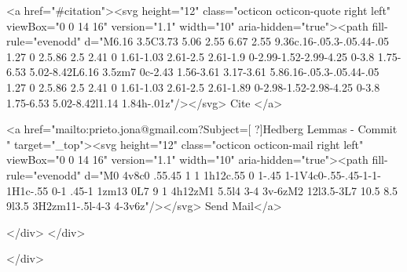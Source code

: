       <a  href="#citation"><svg height="12" class="octicon octicon-quote right left" viewBox="0 0 14 16" version="1.1" width="10" aria-hidden="true"><path fill-rule="evenodd" d="M6.16 3.5C3.73 5.06 2.55 6.67 2.55 9.36c.16-.05.3-.05.44-.05 1.27 0 2.5.86 2.5 2.41 0 1.61-1.03 2.61-2.5 2.61-1.9 0-2.99-1.52-2.99-4.25 0-3.8 1.75-6.53 5.02-8.42L6.16 3.5zm7 0c-2.43 1.56-3.61 3.17-3.61 5.86.16-.05.3-.05.44-.05 1.27 0 2.5.86 2.5 2.41 0 1.61-1.03 2.61-2.5 2.61-1.89 0-2.98-1.52-2.98-4.25 0-3.8 1.75-6.53 5.02-8.42l1.14 1.84h-.01z"/></svg> Cite
      </a>

      <a href="mailto:prieto.jona@gmail.com?Subject=[ ?]Hedberg Lemmas - Commit " target="_top"><svg height="12" class="octicon octicon-mail right left" viewBox="0 0 14 16" version="1.1" width="10" aria-hidden="true"><path fill-rule="evenodd" d="M0 4v8c0 .55.45 1 1 1h12c.55 0 1-.45 1-1V4c0-.55-.45-1-1-1H1c-.55 0-1 .45-1 1zm13 0L7 9 1 4h12zM1 5.5l4 3-4 3v-6zM2 12l3.5-3L7 10.5 8.5 9l3.5 3H2zm11-.5l-4-3 4-3v6z"/></svg> Send Mail</a>

    </div>
  </div>

</div>





